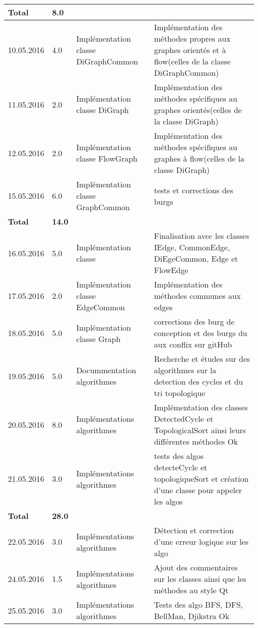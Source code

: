 \documentclass[french]{article}
\begin{document}
\begin{longtable}{p{}|p{}|p{}|p{}}
                \textbf{Total} & \textbf{8.0} &&\\
                \hline
                 10.05.2016 & 4.0 & Implémentation classe DiGraphCommon &  Implémentation des méthodes propres aux graphes orientés et à flow(celles de la classe DiGraphCommon)\\
                11.05.2016 & 2.0 & Implémentation classe DiGraph &  Implémentation des méthodes spécifiques au graphes orientés(celles de la classe DiGraph)\\
                12.05.2016 & 2.0 & Implémentation classe FlowGraph &  Implémentation des méthodes spécifiques au graphes à  flow(celles de la classe DiGraph)\\
                15.05.2016 & 6.0 & Implémentation classe GraphCommon & tests et corrections des burgs \\
                \textbf{Total} & \textbf{14.0} &&\\
                \hline
                16.05.2016 & 5.0 & Implémentation classe &  Finalisation avec les classes IEdge, CommonEdge, DiEgeCommon, Edge et FlowEdge \\
		17.05.2016 & 2.0 & Implémentation classe EdgeCommon & Implémentation des méthodes communes aux edges \\
                18.05.2016 & 5.0 & Implémentation classe Graph & corrections des burg de conception et des burgs du aux conflix sur gitHub \\
                19.05.2016 & 5.0 & Docummentation algorithmes  & Recherche et études sur des algorithmes sur la detection des cycles et du tri topologique \\
                20.05.2016 & 8.0 & Implémentations algorithmes & Implémentation des classes DetectedCycle et TopologicalSort ainsi leurs différentes méthodes Ok \\
		21.05.2016 & 3.0 & Implémentations algorithmes & tests des algos detecteCycle et topologiqueSort et création d'une classe pour appeler les algos \\          
                \textbf{Total} & \textbf{28.0} &&\\
		\hline
                22.05.2016 & 3.0& Implémentations algorithmes &Détection et correction d'une erreur logique sur les algo \\
                24.05.2016 & 1.5 & Implémentations algorithmes &Ajout des commentaires sur les classes ainsi que les méthodes au style Qt \\
                25.05.2016 & 3.0 & Implémentations algorithmes &Tests des algo BFS, DFS, BellMan, Djikstra Ok\\

\end{longtable}
\end{document}
